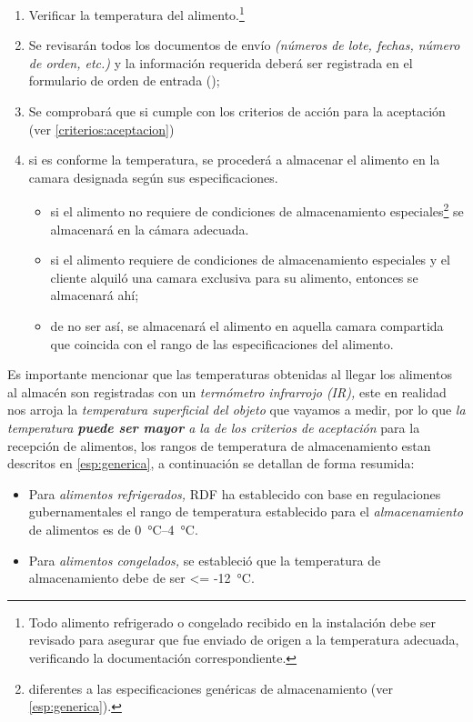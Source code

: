 \begin{enumerate}
\begin{itemize}
		\end{itemize}
	\item Verificar la temperatura del alimento.\footnote{Todo alimento refrigerado o congelado recibido en la instalación debe ser revisado para asegurar que fue enviado de origen a la temperatura adecuada, verificando la documentación correspondiente.}
	\item Se revisarán todos los documentos de envío \emph{(números de lote, fechas, número de orden, etc.)} y la información requerida deberá ser registrada en el formulario de orden de entrada (\Oent);
	\item Se comprobará que si cumple con los criterios de acción para la aceptación (ver \cref{criterios:aceptacion})
	\item si es conforme la temperatura, se procederá a almacenar el alimento en la camara designada según sus especificaciones.
	      \begin{itemize}
		      \item si el \gls{alimento} no requiere de condiciones de almacenamiento especiales\footnote{diferentes a las especificaciones genéricas de almacenamiento (ver \cref{esp:generica}).} se almacenará en la cámara adecuada.
		      \item si el \gls{alimento} requiere de condiciones de almacenamiento especiales y el cliente alquiló una camara exclusiva para su alimento, entonces se almacenará ahí;
		      \item de no ser así, se almacenará el \gls{alimento} en aquella camara compartida que coincida con el rango de las especificaciones del alimento.
	      \end{itemize}
\end{enumerate}

\begin{note}
	Es importante mencionar que las temperaturas obtenidas al llegar los alimentos al almacén son registradas con un \emph{termómetro infrarrojo (IR),} este en realidad nos arroja la \emph{temperatura superficial del objeto} que vayamos a medir, por lo que \emph{la temperatura \textbf{puede ser mayor} a la de los criterios de aceptación} para la recepción de alimentos, los rangos de temperatura de almacenamiento estan descritos en \cref{esp:generica}, a continuación se detallan de forma resumida:
	\begin{itemize}
		\item Para \emph{alimentos refrigerados,} \gls{RDF} ha establecido con base en regulaciones gubernamentales el rango de temperatura establecido para el \emph{almacenamiento} de alimentos es de \qtyrange{0}{4}{\degreeCelsius}.
		\item Para \emph{alimentos congelados,} se estableció que la temperatura de almacenamiento debe de ser \qty{<= -12}{\degreeCelsius}.
	\end{itemize}
\end{note}

